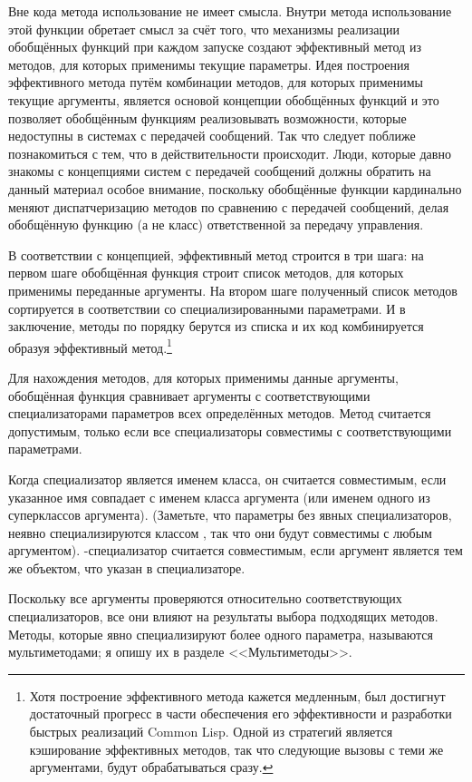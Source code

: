 Вне кода метода использование  не имеет смысла.  Внутри метода
использование этой функции обретает смысл за счёт того, что механизмы реализации
обобщённых функций при каждом запуске создают эффективный метод из методов, для которых
применимы текущие параметры.  Идея построения эффективного метода путём комбинации
методов, для которых применимы текущие аргументы, является основой концепции обобщённых
функций и это позволяет обобщённым функциям реализовывать возможности, которые недоступны
в системах с передачей сообщений.  Так что следует поближе познакомиться с тем, что в
действительности происходит.  Люди, которые давно знакомы с концепциями систем с передачей
сообщений должны обратить на данный материал особое внимание, поскольку обобщённые функции
кардинально меняют диспатчеризацию методов по сравнению с передачей сообщений, делая
обобщённую функцию (а не класс) ответственной за передачу управления.

В соответствии с концепцией, эффективный метод строится в три шага: на первом шаге
обобщённая функция строит список методов, для которых применимы переданные аргументы.  На
втором шаге полученный список методов сортируется в соответствии со специализированными
параметрами.  И в заключение, методы по порядку берутся из списка и их код комбинируется
образуя эффективный метод.\footnote{Хотя построение эффективного метода кажется медленным,
  был достигнут достаточный прогресс в части обеспечения его эффективности и разработки
  быстрых реализаций Common Lisp.  Одной из стратегий является кэширование эффективных
  методов, так что следующие вызовы с теми же аргументами, будут обрабатываться сразу.}

Для нахождения методов, для которых применимы данные аргументы, обобщённая функция
сравнивает аргументы с соответствующими специализаторами параметров всех определённых
методов.  Метод считается допустимым, только если все специализаторы совместимы с
соответствующими параметрами.

Когда специализатор является именем класса, он считается совместимым, если указанное имя
совпадает с именем класса аргумента (или именем одного из суперклассов аргумента).
(Заметьте, что параметры без явных специализаторов, неявно специализируются классом
, так что они будут совместимы с любым аргументом).  -специализатор
считается совместимым, если аргумент является тем же объектом, что указан в
специализаторе.

Поскольку все аргументы проверяются относительно соответствующих специализаторов, все они
влияют на результаты выбора подходящих методов.  Методы, которые явно специализируют более
одного параметра, называются мультиметодами; я опишу их в разделе <<Мультиметоды>>.

